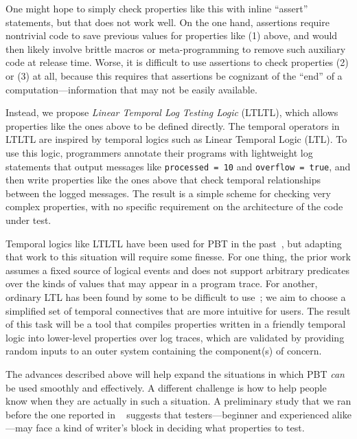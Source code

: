 One might hope to simply check properties like this with
inline ``assert'' statements, but that
does not work well. On the one hand, assertions
require nontrivial code to save previous values for properties like (1)
above, and would then likely involve brittle macros or meta-programming to remove such
auxiliary code at release time. Worse, it is difficult to use
assertions to check properties (2) or (3) at all, because this
requires that assertions be cognizant of the ``end'' of a
computation---information that may not be easily available.

Instead, we propose {\em Linear Temporal Log Testing Logic} (LTLTL), which
allows properties like the ones above to be defined directly. The temporal
operators in LTLTL are inspired by temporal logics such as Linear Temporal Logic
(LTL). To use this logic, programmers annotate their programs with lightweight
log statements that output messages like
\lstinline|processed = 10| and \lstinline|overflow = true|, and then write
properties like the ones above that check temporal relationships between the
logged messages. The result is a simple scheme for checking very complex
properties, with no specific requirement on the architecture of the code under test.

Temporal logics like LTLTL have been used for PBT in the
past~\cite{oconnor_quickstrom_2022}, but adapting that work to this
situation will require some finesse. For one thing, the prior work
assumes a fixed source of logical events and does not
support arbitrary predicates over the kinds of values that may appear
in a program trace. For another, ordinary LTL has been found by some to be
difficult to use~\cite{greenman_little_2022}; we aim to choose a
simplified set of temporal connectives that are more intuitive for users.
%
The result of this task will be a tool that compiles properties written
in a friendly temporal logic into lower-level properties over log
traces, which are validated by providing random inputs to an outer
system {containing} the component(s) of concern.


%
The advances described above will help expand the situations in which
PBT {\em can} be used smoothly and effectively.  A different challenge is
how to help people know when they are actually in such a situation.
A preliminary study that we ran before the one reported in ~\cite{goldstein_problems_2022} suggests that testers---beginner and experienced alike---may face a kind of writer's block
in deciding what properties to test.

